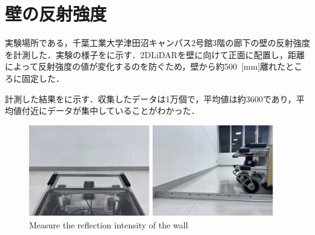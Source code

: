 \section{壁の反射強度}

  実験場所である，千葉工業大学津田沼キャンパス2号館3階の廊下の壁の反射強度を計測した．実験の様子をに示す．2DLiDARを壁に向けて正面に配置し，距離によって反射強度の値が変化するのを防ぐため，壁から約500 \,[mm]離れたところに固定した．
  
  計測した結果をに示す．収集したデータは1万個で，平均値は約3600であり，平均値付近にデータが集中していることがわかった．

  \begin{figure}[h]
    \centering
    \begin{minipage}[c]{65mm} 
        \centering
        \includegraphics[height=40mm]{images/pdf/RobotGuidance_exp1_wall_from_back}
    \end{minipage}
    \begin{minipage}[c]{65mm} 
        \centering
        \includegraphics[height=40mm]{images/pdf/RobotGuidance_exp1_wall_from_side}
    \end{minipage}
    \caption{Measure the reflection intensity of the wall}
    \label{Fig:RobotGuidance_exp1_wall}
  \end{figure}

